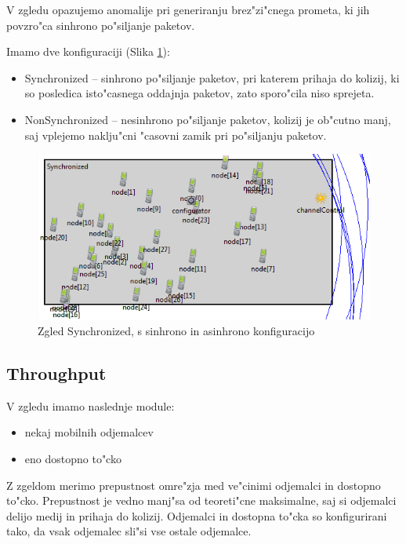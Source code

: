 \documentclass[a4paper,11pt]{article}
\begin{document}
V zgledu opazujemo anomalije pri generiranju brez"zi"cnega prometa, ki jih povzro"ca sinhrono po"siljanje paketov.

Imamo dve konfiguraciji (Slika \ref{image:synchronized}):
\begin{itemize}
    \item Synchronized – sinhrono po"siljanje paketov, pri katerem prihaja do kolizij, ki so posledica isto"casnega oddajnja paketov, zato sporo"cila niso sprejeta.
    \item NonSynchronized – nesinhrono po"siljanje paketov, kolizij je ob"cutno manj, saj vplejemo naklju"cni "casovni zamik pri po"siljanju paketov.
\end{itemize}


\begin{figure}[htbp]
    \begin{center}
        \includegraphics[scale=0.8]{img/zgledi/synchronized_sync.png}
        \caption{Zgled Synchronized, s sinhrono in asinhrono konfiguracijo}
	\label{image:synchronized}
    \end{center}
\end{figure}




\subsection{Throughput}

V zgledu imamo naslednje module:
\begin{itemize}
    \item nekaj mobilnih odjemalcev
    \item eno dostopno to"cko
\end{itemize}

Z zgeldom merimo prepustnost omre"zja med ve"cinimi odjemalci in dostopno to"cko. Prepustnost je vedno manj"sa od teoreti"cne maksimalne, saj si odjemalci delijo medij in prihaja do kolizij. Odjemalci in dostopna to"cka so konfigurirani tako, da vsak odjemalec sli"si vse ostale odjemalce.\\
\end{document}
